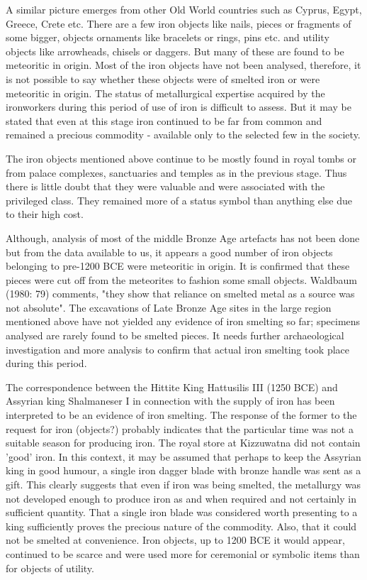 {A similar picture emerges from other Old World countries such as Cyprus, Egypt, Greece, Crete etc. There are a few iron objects like nails, pieces or fragments of some bigger, objects ornaments like bracelets or rings, pins etc. and utility objects like arrowheads, chisels or daggers. But many of these are found to be meteoritic in origin. Most of the iron objects have not been analysed, therefore, it is not possible to say whether these objects were of smelted iron or were meteoritic in origin. The status of metallurgical expertise acquired by the ironworkers during this period of use of iron is difficult to assess. But it may be stated that even at this stage iron continued to be far from common and remained a precious commodity - available only to the selected few in the society.

The iron objects mentioned above continue to be mostly found in royal tombs or from palace complexes, sanctuaries and temples as in the previous stage. Thus there is little doubt that they were valuable and were associated with the privileged class. They remained more of a status symbol than anything else due to their high cost.

Although, analysis of most of the middle Bronze Age artefacts has not been done but from the data available to us, it appears a good number of iron objects belonging to pre-1200 BCE were meteoritic in origin. It is confirmed that these pieces were cut off from the meteorites to fashion some small objects. Waldbaum (1980: 79) comments, "they show that reliance on smelted metal as a source was not absolute". The excavations of Late Bronze Age sites in the large region mentioned above have not yielded any evidence of iron smelting so far; specimens analysed are rarely found to be smelted pieces. It needs further archaeological investigation and more analysis to confirm that actual iron smelting took place during this period.

The correspondence between the Hittite King Hattusilis III (1250 BCE) and Assyrian king Shalmaneser I in connection with the supply of iron has been interpreted to be an evidence of iron smelting. The response of the former to the request for iron (objects?) probably indicates that the particular time was not a suitable season for producing iron. The royal store at Kizzuwatna did not contain 'good' iron. In this context, it may be assumed that perhaps to keep the Assyrian king in good humour, a single iron dagger blade with bronze handle was sent as a gift. This clearly suggests that even if iron was being smelted, the metallurgy was not developed enough to produce iron as and when required and not certainly in sufficient quantity. That a single iron blade was considered worth presenting to a king sufficiently proves the precious nature of the commodity. Also, that it could not be smelted at convenience. Iron objects, up to 1200 BCE it would appear, continued to be scarce and were used more for ceremonial or symbolic items than for objects of utility.

}
